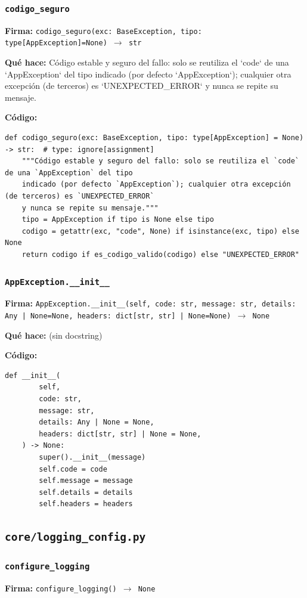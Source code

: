 \documentclass[11pt,a4paper]{article}
\begin{document}
\subsubsection*{\texttt{codigo\_seguro}}
\textbf{Firma:} \texttt{codigo\_seguro(exc: BaseException, tipo: type[AppException]=None) $\rightarrow$ str}

\textbf{Qué hace:} Código estable y seguro del fallo: solo se reutiliza el `code` de una `AppException` del tipo
indicado (por defecto `AppException`); cualquier otra excepción (de terceros) es `UNEXPECTED\_ERROR`
y nunca se repite su mensaje.

\textbf{Código:}
\begin{lstlisting}
def codigo_seguro(exc: BaseException, tipo: type[AppException] = None) -> str:  # type: ignore[assignment]
    """Código estable y seguro del fallo: solo se reutiliza el `code` de una `AppException` del tipo
    indicado (por defecto `AppException`); cualquier otra excepción (de terceros) es `UNEXPECTED_ERROR`
    y nunca se repite su mensaje."""
    tipo = AppException if tipo is None else tipo
    codigo = getattr(exc, "code", None) if isinstance(exc, tipo) else None
    return codigo if es_codigo_valido(codigo) else "UNEXPECTED_ERROR"
\end{lstlisting}

\subsubsection*{\texttt{AppException.\_\_init\_\_}}
\textbf{Firma:} \texttt{AppException.\_\_init\_\_(self, code: str, message: str, details: Any | None=None, headers: dict[str, str] | None=None) $\rightarrow$ None}

\textbf{Qué hace:} (sin docstring)

\textbf{Código:}
\begin{lstlisting}
def __init__(
        self,
        code: str,
        message: str,
        details: Any | None = None,
        headers: dict[str, str] | None = None,
    ) -> None:
        super().__init__(message)
        self.code = code
        self.message = message
        self.details = details
        self.headers = headers
\end{lstlisting}

\subsection{\texttt{core/logging\_config.py}}

\subsubsection*{\texttt{configure\_logging}}
\textbf{Firma:} \texttt{configure\_logging() $\rightarrow$ None}
\end{document}
